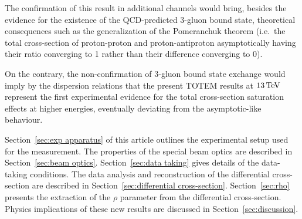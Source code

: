 The confirmation of this result in additional channels would bring, besides the evidence for the existence of the QCD-predicted 3-gluon bound state, theoretical consequences such as the generalization of the Pomeranchuk theorem (i.e.~the total cross-section of proton-proton and proton-antiproton asymptotically having their ratio converging to 1 rather than their difference converging to 0).

On the contrary, the non-confirmation of 3-gluon bound state exchange would imply by the dispersion relations that the present TOTEM results at $13\,{\rm TeV}$ represent the first experimental evidence for the total cross-section saturation effects at higher energies, eventually deviating from the asymptotic-like behaviour.

Section~\ref{sec:exp apparatus} of this article outlines the experimental setup used for the measurement. The properties of the special beam optics are described in Section~\ref{sec:beam optics}. Section~\ref{sec:data taking} gives details of the data-taking conditions. The data analysis and reconstruction of the differential cross-section are described in Section~\ref{sec:differential cross-section}. Section~\ref{sec:rho} presents the extraction of the $\rho$ parameter from the differential cross-section. Physics implications of these new results are discussed in Section~\ref{sec:discussion}.
